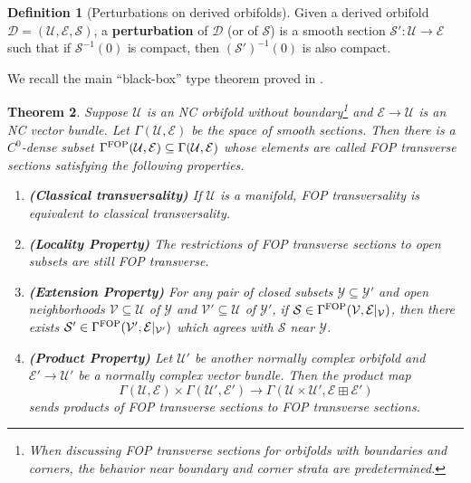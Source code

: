 \documentclass[reqno, 10pt]{amsart}
\numberwithin{equation}{section}
\numberwithin{equation}{section}
\renewcommand{\subset}{\subseteq}
\newtheorem{thm}{Theorem}[section]
\theoremstyle{definition}
\newtheorem{defn}[thm]{Definition}
\theoremstyle{remark}
\newcommand{\beqn}{\begin{equation*}}
\newcommand{\eeqn}{\end{equation*}}
\newcommand{\mc}{\mathcal}
\begin{document}
\begin{defn}[Perturbations on derived orbifolds%
] \hfill
Given a derived orbifold ${\mc D} = ({\mc U}, {\mc E}, {\mc S})$, a {\bf perturbation} of ${\mc D}$ (or of ${\mc S}$) is a smooth section ${\mc S}': {\mc U} \to {\mc E}$ such that if ${\mc S}^{-1}(0)$ is compact, then $({\mc S}')^{-1}(0)$ is also compact.

\end{defn}


We recall the main ``black-box'' type theorem proved in \cite{Bai_Xu_2022}.

\begin{thm}\label{thm_FOP_property}\cite[Theorem 1.1]{Bai_Xu_2022}
Suppose ${\mc U}$ is an NC orbifold without boundary\footnote{When discussing FOP transverse sections for orbifolds with boundaries and corners, the behavior near boundary and corner strata are predetermined.} and ${\mc E} \to {\mc U}$ is an NC vector bundle. Let $\Gamma({\mc U}, {\mc E})$ be the space of smooth sections. Then there is a $C^0$-dense subset $\Gamma^{\rm FOP}({\mc U}, {\mc E}) \subset \Gamma({\mc U}, {\mc E})$ whose elements are called \emph{FOP transverse sections} satisfying the following properties.
\begin{enumerate}

\item {\bf (Classical transversality)} If ${\mc U}$ is a manifold, FOP transversality is equivalent to classical transversality.

\item {\bf (Locality Property)} The restrictions of FOP transverse sections to open subsets are still FOP transverse. 

\item {\bf (Extension Property)} For any pair of closed subsets ${\mc Y} \subset {\mc Y}'$ and open neighborhoods ${\mc V} \subset {\mc U}$ of ${\mc Y}$ and ${\mc V}' \subset {\mc U}$ of ${\mc Y}'$, if ${\mc S} \in \Gamma^{\rm FOP}({\mc V}, {\mc E}|_{{\mc V}})$, then there exists ${\mc S}' \in \Gamma^{\rm FOP}({\mc V}', {\mc E}|_{{\mc V}'})$ which agrees with ${\mc S}$ near ${\mc Y}$.

\item {\bf (Product Property)} Let ${\mc U}'$ be another normally complex  orbifold and ${\mc E}' \to {\mc U}'$ be a normally complex  vector bundle. Then the product map 
\beqn
\Gamma({\mc U}, {\mc E}) \times \Gamma({\mc U}', {\mc E}') \to \Gamma({\mc U} \times {\mc U}', {\mc E}\boxplus {\mc E}')
\eeqn
sends products of FOP transverse sections to FOP transverse sections.


\end{enumerate}
\end{thm}
\end{document}
